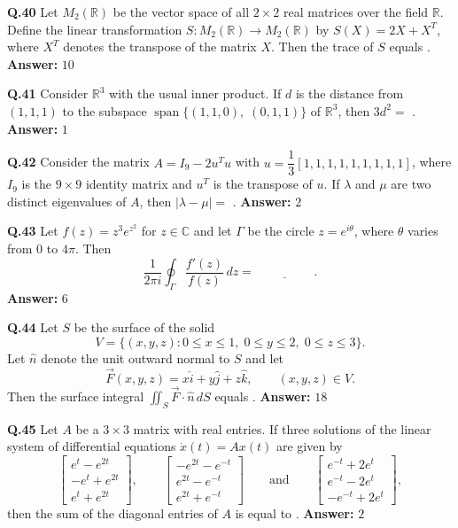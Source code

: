 \documentclass[11pt,a4paper]{article}
\newcommand{\ans}[1]{\textbf{Answer:} #1\par\medskip}
\begin{document}
\textbf{Q.40} Let $M_2(\mathbb{R})$ be the vector space of all $2 \times 2$ real matrices over the field $\mathbb{R}$. Define the linear transformation $S : M_2(\mathbb{R}) \to M_2(\mathbb{R})$ by $S(X) = 2X + X^T$, where $X^T$ denotes the transpose of the matrix $X$. Then the trace of $S$ equals \underline{\hspace{2cm}}.
\ans{$10$}

\textbf{Q.41} Consider $\mathbb{R}^3$ with the usual inner product. If $d$ is the distance from $(1, 1, 1)$ to the subspace $\operatorname{span}\{(1, 1, 0),\; (0, 1, 1)\}$ of $\mathbb{R}^3$, then $3d^2 =$ \underline{\hspace{2cm}}.
\ans{$1$}

\textbf{Q.42} Consider the matrix $A = I_9 - 2u^T u$ with $u = \dfrac{1}{3}[1, 1, 1, 1, 1, 1, 1, 1, 1]$, where $I_9$ is the $9 \times 9$ identity matrix and $u^T$ is the transpose of $u$. If $\lambda$ and $\mu$ are two distinct eigenvalues of $A$, then $|\lambda - \mu| =$ \underline{\hspace{2cm}}.
\ans{$2$}

\textbf{Q.43} Let $f(z) = z^3 e^{z^2}$ for $z \in \mathbb{C}$ and let $\Gamma$ be the circle $z = e^{i\theta}$, where $\theta$ varies from $0$ to $4\pi$. Then
\[
  \frac{1}{2\pi i} \oint_\Gamma \frac{f'(z)}{f(z)}\,dz = \underline{\hspace{2cm}}.
\]
\ans{$6$}

\textbf{Q.44} Let $S$ be the surface of the solid
\[
  V = \{(x, y, z) : 0 \le x \le 1,\; 0 \le y \le 2,\; 0 \le z \le 3\}.
\]
Let $\hat{n}$ denote the unit outward normal to $S$ and let
\[
  \vec{F}(x, y, z) = x\hat{i} + y\hat{j} + z\hat{k}, \qquad (x, y, z) \in V.
\]
Then the surface integral $\displaystyle\iint_S \vec{F} \cdot \hat{n}\,dS$ equals \underline{\hspace{2cm}}.
\ans{$18$}

\textbf{Q.45} Let $A$ be a $3 \times 3$ matrix with real entries. If three solutions of the linear system of differential equations $\dot{x}(t) = A x(t)$ are given by
\[
  \begin{bmatrix} e^t - e^{2t} \\ -e^t + e^{2t} \\ e^t + e^{2t} \end{bmatrix}, \qquad
  \begin{bmatrix} -e^{2t} - e^{-t} \\ e^{2t} - e^{-t} \\ e^{2t} + e^{-t} \end{bmatrix} \qquad \text{and} \qquad
  \begin{bmatrix} e^{-t} + 2e^t \\ e^{-t} - 2e^t \\ -e^{-t} + 2e^t \end{bmatrix},
\]
then the sum of the diagonal entries of $A$ is equal to \underline{\hspace{2cm}}.
\ans{$2$}
\end{document}
